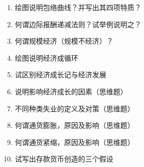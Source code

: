\documentclass[
]{article}
\begin{document}
\begin{multicols}{2}
    \begin{enumerate}
    \def\labelenumi{\arabic{enumi}.}
    \item
      绘图说明包络曲线？并写出其四项特质？
    \item
      何谓边际报酬递减法则？试举例说明之？
    \item
      何谓规模经济（规模不经济）？
    \item
      绘图说明经济成循环
    \item
      试区别经济成长记与经济发展
    \item
      说明影响经济成长的因素（思维题）
    \item
      不同种类失业的定义及对策（思维题）
    \item
      何谓通货膨胀，原因及影响（思维题）
    \item
      何谓通货紧缩，原因及影响（思维题）
    \item
      试写出存款货币创造的三个假设
    \end{enumerate}
\end{multicols}
\end{document}
